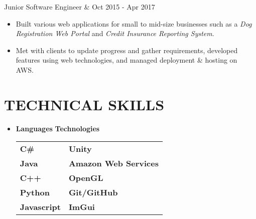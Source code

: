 \documentclass[resmargin,10pt]{res} %
\begin{document}
\begin{resume}
                \begin{ncolumn}{2} %
                Junior Software Engineer &  \hfill Oct 2015 - Apr 2017
                \end{ncolumn}
                \begin{itemize}           
                \item  Built various web applications for small to mid-size businesses such as a \textit{Dog Registration Web Portal} and \textit{Credit Insurance Reporting System}.
                \item Met with clients to update progress and gather requirements, developed features using web technologies, and managed deployment \& hosting on AWS.
                \end{itemize}
                    
\section{TECHNICAL SKILLS}	
							\begin{itemize}
                    		\item[] 
\textbf{\large Languages}  \hspace*{.5in} \textbf{\large Technologies}        \\
\begin{tabular}{ll}
\textbf{C\#} \hspace*{1in}  & \textbf{Unity} \\
\textbf{Java} & \textbf{Amazon Web Services} \\
\textbf{C++}   & \textbf{OpenGL}       \\
\textbf{Python}  & \textbf{Git/GitHub}               \\
\textbf{Javascript} & \textbf{ImGui}               \\
\end{tabular}
                    		\end{itemize} 

\end{resume}
\end{document}

